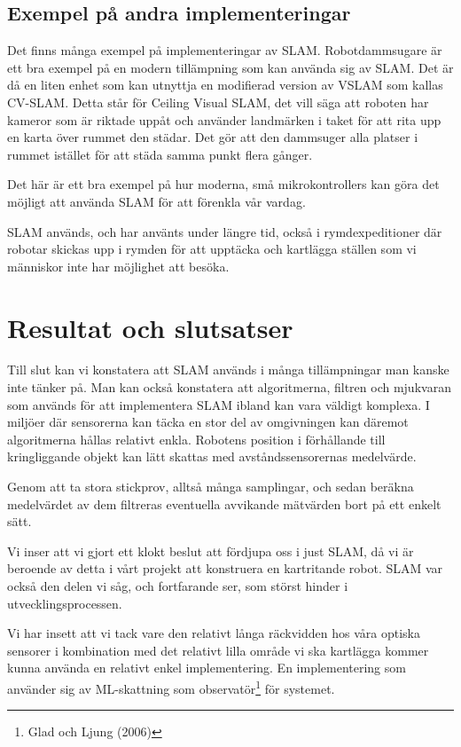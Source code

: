 \documentclass[a4paper,12pt,fleqn]{article}
\begin{document}
\subsection{Exempel på andra implementeringar}

Det finns många exempel på implementeringar av SLAM. Robotdammsugare är ett bra exempel på en modern tillämpning som kan använda sig av SLAM. Det är då en liten enhet som kan utnyttja en modifierad version av VSLAM som kallas CV-SLAM. Detta står för Ceiling Visual SLAM, det vill säga att roboten har kameror som är riktade uppåt och använder landmärken i taket för att rita upp en karta över rummet den städar. Det gör att den dammsuger alla platser i rummet istället för att städa samma punkt flera gånger. 

Det här är ett bra exempel på hur moderna, små mikrokontrollers kan göra det möjligt att använda SLAM för att förenkla vår vardag.

SLAM används, och har använts under längre tid, också i rymdexpeditioner där robotar skickas upp i rymden för att upptäcka och kartlägga ställen som vi människor inte har möjlighet att besöka. 

\newpage

\section{Resultat och slutsatser}

Till slut kan vi konstatera att SLAM används i många tillämpningar man kanske inte tänker på. Man kan också konstatera att algoritmerna, filtren och mjukvaran som används för att implementera SLAM ibland kan vara väldigt komplexa. I miljöer där sensorerna kan täcka en stor del av omgivningen kan däremot algoritmerna hållas relativt enkla. Robotens position i förhållande till kringliggande objekt kan lätt skattas med avståndssensorernas medelvärde. 

Genom att ta stora stickprov, alltså många samplingar, och sedan beräkna medelvärdet av dem filtreras eventuella avvikande mätvärden bort på ett enkelt sätt. 

Vi inser att vi gjort ett klokt beslut att fördjupa oss i just SLAM, då vi är beroende av detta i vårt projekt att konstruera en kartritande robot. SLAM var också den delen vi såg, och fortfarande ser, som störst hinder i utvecklingsprocessen. 

Vi har insett att vi tack vare den relativt långa räckvidden hos våra optiska sensorer i kombination med det relativt lilla område vi ska kartlägga kommer kunna använda en relativt enkel implementering. En implementering som använder sig av ML-skattning som observatör\footnote{Glad och Ljung (2006)} för systemet. 
\end{document}
